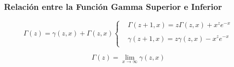 \subsubsection{Relación entre la Función Gamma Superior e Inferior}

\[ \Gamma(z)=\gamma(z,x)+\Gamma(z,x) \left\{ \begin{array}{rcl}
		 & \Gamma(z+1,x)=z\Gamma(z,x)+x^z e^{-x} \\
		 &                                       \\
		 & \gamma(z+1,x)=z\gamma(z,x)-x^z e^{-x} \\
	\end{array}
	\right. \]

$$
	\Gamma(z)=\lim_{x\to\infty} \gamma(z,x)
$$


